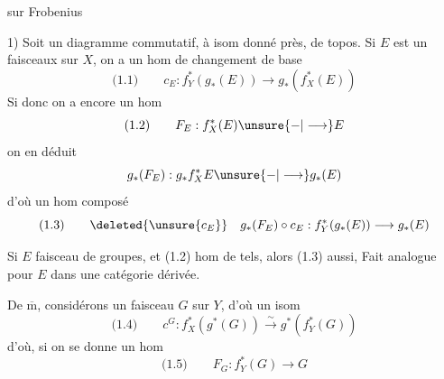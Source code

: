  sur Frobenius

1) Soit
un diagramme commutatif, à isom donné près, de topos. Si $E$ est un  faisceaux   sur $X$, on a  un hom de changement de base
\[
\text{(1.1)}\qquad c_E:f_Y^*(g_*(E))\longrightarrow g_*(f_X^*(E))
\]
Si donc on a encore un hom
\[
\text{(1.2)}\qquad F_E:f_X^*(E)\unsure{-|\longrightarrow}E
\]
on en déduit
\[
g_*(F_E):g_*f_X^*E\unsure{-|\longrightarrow}g_*(E)
\]
d'où un hom composé
\[
\text{(1.3)}\qquad\deleted{\unsure{c_E}}\quad g_*(F_E)\circ c_E:f_Y^*(g_*(E))\longrightarrow g_*(E)
\]

Si $E$ faisceau de groupes, et (1.2) hom de tels, alors (1.3) aussi,  Fait analogue pour $E$ dans une catégorie dérivée.

De $\overline{\mathrm m}$, considérons un faisceau $G$ sur $Y$, d'où un isom
\[
\text{(1.4)}\qquad c^G:f_X^*(g^*(G))\xrightarrow{\sim}g^*(f_Y^*(G))
\]
d'où, si on se donne un hom
\[
\text{(1.5)}\qquad F_G:f_Y^*(G)\longrightarrow G
\]
